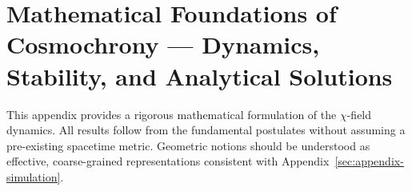 \clearpage

\section{Mathematical Foundations of Cosmochrony --- Dynamics, Stability, and Analytical Solutions}
\label{sec:appendix-math}

This appendix provides a rigorous mathematical formulation of the $\chi$-field dynamics.
All results follow from the fundamental postulates without assuming a
pre-existing spacetime metric.
Geometric notions should be understood as effective, coarse-grained
representations consistent with Appendix~\ref{sec:appendix-simulation}.

















